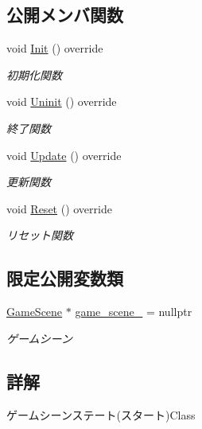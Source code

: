 \subsection*{公開メンバ関数}
\begin{DoxyCompactItemize}
\item 
void \mbox{\hyperlink{class_game_scene_state___start_ae921c57f349fbb2f00a197d40a3404b7}{Init}} () override
\begin{DoxyCompactList}\small\item\em 初期化関数 \end{DoxyCompactList}\item 
void \mbox{\hyperlink{class_game_scene_state___start_a636df8b7ac0173b044b0efc2927fb83b}{Uninit}} () override
\begin{DoxyCompactList}\small\item\em 終了関数 \end{DoxyCompactList}\item 
void \mbox{\hyperlink{class_game_scene_state___start_ae11bb8d8ea9eae4fea2a9acf33dd1c8b}{Update}} () override
\begin{DoxyCompactList}\small\item\em 更新関数 \end{DoxyCompactList}\item 
void \mbox{\hyperlink{class_game_scene_state___start_a59270f7b65613f580864ed8ea3056179}{Reset}} () override
\begin{DoxyCompactList}\small\item\em リセット関数 \end{DoxyCompactList}\end{DoxyCompactItemize}
\subsection*{限定公開変数類}
\begin{DoxyCompactItemize}
\item 
\mbox{\hyperlink{class_game_scene}{Game\+Scene}} $\ast$ \mbox{\hyperlink{class_game_scene_state___start_af9389c7c8496419a6a4a3d3339acd94f}{game\+\_\+scene\+\_\+}} = nullptr
\begin{DoxyCompactList}\small\item\em ゲームシーン \end{DoxyCompactList}\end{DoxyCompactItemize}


\subsection{詳解}
ゲームシーンステート(スタート)Class 

